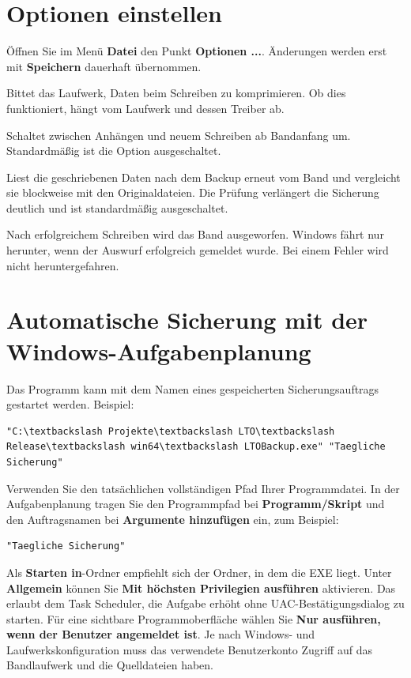 \documentclass[11pt,a4paper]{article}
\begin{document}
\section{Optionen einstellen}\label{sec:optionen}
Öffnen Sie im Menü \textbf{Datei} den Punkt \textbf{Optionen ...}. Änderungen werden erst mit \textbf{Speichern} dauerhaft übernommen.
\begin{description}[style=nextline]
\item[Hardware-Kompression verwenden] Bittet das Laufwerk, Daten beim Schreiben zu komprimieren. Ob dies funktioniert, hängt vom Laufwerk und dessen Treiber ab.
\item[An vorhandenes Backup anhängen] Schaltet zwischen Anhängen und neuem Schreiben ab Bandanfang um. Standardmäßig ist die Option ausgeschaltet.
\item[Dateiinhalte nach dem Schreiben byteweise prüfen] Liest die geschriebenen Daten nach dem Backup erneut vom Band und vergleicht sie blockweise mit den Originaldateien. Die Prüfung verlängert die Sicherung deutlich und ist standardmäßig ausgeschaltet.
\item[Nach erfolgreichem Backup PC herunterfahren] Nach erfolgreichem Schreiben wird das Band ausgeworfen. Windows fährt nur herunter, wenn der Auswurf erfolgreich gemeldet wurde. Bei einem Fehler wird nicht heruntergefahren.
\end{description}

\section{Automatische Sicherung mit der Windows-Aufgabenplanung}
Das Programm kann mit dem Namen eines gespeicherten Sicherungsauftrags gestartet werden. Beispiel:
\begin{lstlisting}
"C:\textbackslash Projekte\textbackslash LTO\textbackslash Release\textbackslash win64\textbackslash LTOBackup.exe" "Taegliche Sicherung"
\end{lstlisting}
Verwenden Sie den tatsächlichen vollständigen Pfad Ihrer Programmdatei. In der Aufgabenplanung tragen Sie den Programmpfad bei \textbf{Programm/Skript} und den Auftragsnamen bei \textbf{Argumente hinzufügen} ein, zum Beispiel:
\begin{lstlisting}
"Taegliche Sicherung"
\end{lstlisting}
Als \textbf{Starten in}-Ordner empfiehlt sich der Ordner, in dem die EXE liegt. Unter \textbf{Allgemein} können Sie \textbf{Mit höchsten Privilegien ausführen} aktivieren. Das erlaubt dem Task Scheduler, die Aufgabe erhöht ohne UAC-Bestätigungsdialog zu starten. Für eine sichtbare Programmoberfläche wählen Sie \textbf{Nur ausführen, wenn der Benutzer angemeldet ist}. Je nach Windows- und Laufwerkskonfiguration muss das verwendete Benutzerkonto Zugriff auf das Bandlaufwerk und die Quelldateien haben.
\end{document}
